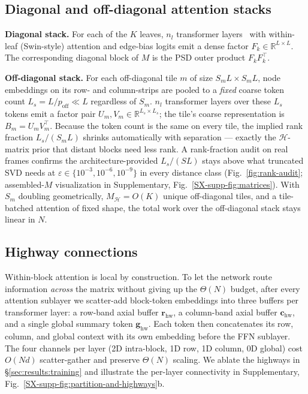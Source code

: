 \documentclass[acmtog]{acmart}
\theoremstyle{plain}
\begin{document}
\subsection{Diagonal and off-diagonal attention stacks}
\label{sec:method:stacks}
\noindent\textbf{Diagonal stack.} For each of the $K$ leaves, $n_l$ transformer
layers~\cite{Liu2021swin,vaswani2017attention} with within-leaf (Swin-style) attention
and edge-bias logits emit a dense factor $F_k\!\in\!\mathbb{R}^{L\times L}$. The
corresponding diagonal block of $M$ is the PSD outer product $F_kF_k^\top$.

\noindent\textbf{Off-diagonal stack.} For each off-diagonal tile $m$ of size
$S_mL\!\times\!S_mL$, node embeddings on its row- and column-strips are pooled to a
\emph{fixed} coarse token count $L_s\!=\!L/p_{\mathrm{off}}\!\ll\!L$ regardless of $S_m$.
$n_l$ transformer layers over these $L_s$ tokens emit a factor pair
$U_m,V_m\!\in\!\mathbb{R}^{L_s\times L_s}$; the tile's coarse representation is
$B_m\!=\!U_mV_m^\top$. Because the token count is the same on every tile, the implied
rank fraction $L_s/(S_mL)$ shrinks automatically with separation --- exactly the
$\mathcal{H}$-matrix prior that distant blocks need less rank. A rank-fraction audit on
real frames confirms the architecture-provided $L_s/(SL)$ stays above what truncated SVD
needs at $\varepsilon\!\in\!\{10^{-3},10^{-6},10^{-9}\}$ in every distance class
(Fig.~\ref{fig:rank-audit}; assembled-$M$ visualization in Supplementary, Fig.~\ref{SX-supp-fig:matrices}). With $S_m$ doubling
geometrically, $M_{\mathcal{H}}\!=\!O(K)$ unique off-diagonal tiles, and a tile-batched
attention of fixed shape, the total work over the off-diagonal stack stays linear in $N$.

\subsection{Highway connections}
\label{sec:method:highways}
Within-block attention is local by construction. To let the network route information
\emph{across} the matrix without giving up the $\Theta(N)$ budget, after every attention
sublayer we scatter-add block-token embeddings into three buffers per transformer layer:
a row-band axial buffer $\mathbf{r}_{\mathrm{hw}}$, a column-band axial buffer
$\mathbf{c}_{\mathrm{hw}}$, and a single global summary token $\mathbf{g}_{\mathrm{hw}}$.
Each token then concatenates its row, column, and global context with its own embedding
before the FFN sublayer. The four channels per layer (2D intra-block, 1D row, 1D column,
0D global) cost $O(Nd)$ scatter-gather and preserve $\Theta(N)$ scaling. We ablate the
highways in \S\ref{sec:results:training} and illustrate the per-layer connectivity in
Supplementary, Fig.~\ref{SX-supp-fig:partition-and-highways}b.
\end{document}
